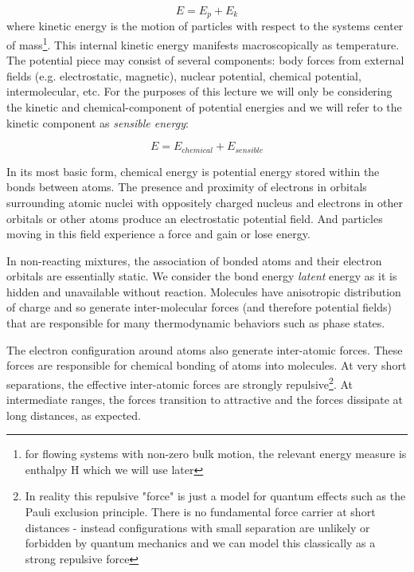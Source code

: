 \documentclass[twocolumn]{memoir} %
\begin{document}
\begin{equation}
    E = E_p + E_k
\end{equation}
%
where kinetic energy is the motion of particles with respect to the systems center of mass\footnote{for
flowing systems with non-zero bulk motion, the relevant energy measure is enthalpy H which we will use
later}.  This internal kinetic energy manifests macroscopically as temperature.
The potential piece may consist of several components: body forces from external fields (e.g.
electrostatic, magnetic), nuclear potential, chemical potential, intermolecular, etc.  For the 
purposes of this lecture we will only be considering the kinetic and chemical-component of potential
energies and we will refer to the kinetic component as \emph{sensible energy}:

\begin{equation}
    E = E_{chemical} + E_{sensible}
\end{equation}

In its most basic form, chemical energy is potential energy stored within the bonds between atoms.  
The presence and proximity of
electrons in orbitals surrounding atomic nuclei with oppositely charged nucleus and 
electrons in other orbitals or other atoms produce an electrostatic potential field.  And particles
moving in this field experience a force and gain or lose energy.

In non-reacting mixtures, the association of bonded atoms and their electron orbitals
are essentially static.  We consider the bond energy \emph{latent} energy as it is hidden
and unavailable without reaction.  Molecules have anisotropic distribution of charge and so generate
inter-molecular forces (and therefore potential fields) that are responsible for many
thermodynamic behaviors such as phase states.

The electron configuration around atoms also generate inter-atomic forces.  These forces are responsible
for chemical bonding of atoms into molecules.  At very short separations, the effective inter-atomic forces are
strongly repulsive\footnote{In reality this repulsive "force" is just a model for quantum effects such as the
Pauli exclusion principle.  There is no fundamental force carrier at short distances - instead configurations
with small separation are unlikely or forbidden by quantum mechanics and we can model this classically as a
strong repulsive force}.  At intermediate ranges, the forces transition to attractive and the forces dissipate
at long distances, as expected.
\end{document}

